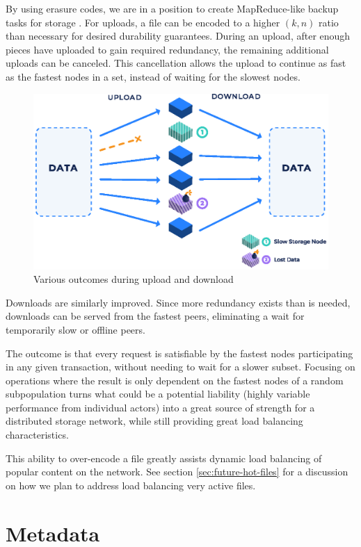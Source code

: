 \documentclass[8pt,fleqn,openany]{book}
\begin{document}
By using erasure codes, we are in a position to create MapReduce-like
backup tasks for storage \cite{rs-stragglers, rs-intro}.
For uploads, a file can be encoded to a higher $(k, n)$ ratio than
necessary for desired durability guarantees.
During an upload, after enough pieces have uploaded to gain required
redundancy, the remaining additional uploads can be canceled.
This cancellation allows the upload to continue as fast as the fastest nodes
in a set, instead of waiting for the slowest nodes.

\begin{figure}[!htbp]
\centering
\includegraphics[height=.35\textheight]{images/redundancy.eps}
\caption{Various outcomes during upload and download}
\end{figure}

Downloads are similarly improved. Since more redundancy exists than is needed,
downloads can be served from the fastest peers, eliminating a wait for temporarily slow or offline peers.

The outcome is that every request is satisfiable by the fastest nodes
participating in any given transaction, without needing to wait for a slower
subset.
Focusing on operations where the result is only dependent on the fastest
nodes of a random subpopulation turns what could be a potential liability
(highly variable performance from individual actors) into a great source of
strength for a distributed storage network, while still providing great load
balancing characteristics.

This ability to over-encode a file greatly assists dynamic load balancing of
popular content on the network. See section \ref{sec:future-hot-files} for
a discussion on how we plan to address load balancing very active files.

\section{Metadata}\label{sec:framework-metadata}
\end{document}
